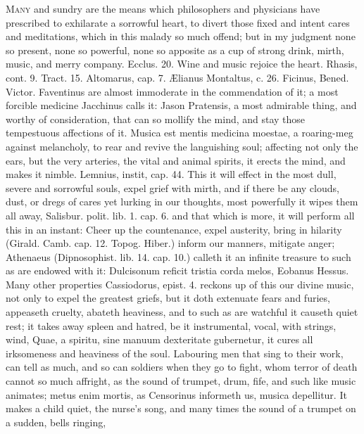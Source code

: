 {\lettrine{M}{any} and sundry are the means which philosophers and physicians have
prescribed to exhilarate a sorrowful heart, to divert those fixed and
intent cares and meditations, which in this malady so much offend; but
in my judgment none so present, none so powerful, none so apposite as a
cup of strong drink, mirth, music, and merry company. Ecclus.  20.
Wine and music rejoice the heart. Rhasis, cont. 9. Tract. 15.
Altomarus, cap. 7. \AE{}lianus Montaltus, c. 26. Ficinus, Bened. Victor.
Faventinus are almost immoderate in the commendation of it; a most
forcible medicine Jacchinus calls it: Jason Pratensis, a most
admirable thing, and worthy of consideration, that can so mollify the
mind, and stay those tempestuous affections of it. Musica est mentis
medicina moestae, a roaring-meg against melancholy, to rear and revive
the languishing soul; affecting not only the ears, but the very
arteries, the vital and animal spirits, it erects the mind, and makes
it nimble. Lemnius, instit, cap. 44. This it will effect in the most
dull, severe and sorrowful souls, expel grief with mirth, and if
there be any clouds, dust, or dregs of cares yet lurking in our
thoughts, most powerfully it wipes them all away, Salisbur. polit. lib.
1. cap. 6. and that which is more, it will perform all this in an
instant: Cheer up the countenance, expel austerity, bring in
hilarity (Girald. Camb. cap. 12. Topog. Hiber.) inform our manners,
mitigate anger; Athenaeus (Dipnosophist. lib. 14. cap. 10.) calleth it
an infinite treasure to such as are endowed with it: Dulcisonum reficit
tristia corda melos, Eobanus Hessus. Many other properties
Cassiodorus, epist. 4. reckons up of this our divine music, not
only to expel the greatest griefs, but it doth extenuate fears and
furies, appeaseth cruelty, abateth heaviness, and to such as are
watchful it causeth quiet rest; it takes away spleen and hatred, be it
instrumental, vocal, with strings, wind, Quae, a spiritu, sine
manuum dexteritate gubernetur, \etc{} it cures all irksomeness and
heaviness of the soul. Labouring men that sing to their work, can
tell as much, and so can soldiers when they go to fight, whom terror of
death cannot so much affright, as the sound of trumpet, drum, fife, and
such like music animates; metus enim mortis, as Censorinus
informeth us, musica depellitur. It makes a child quiet, the nurse's
song, and many times the sound of a trumpet on a sudden, bells ringing,
}
